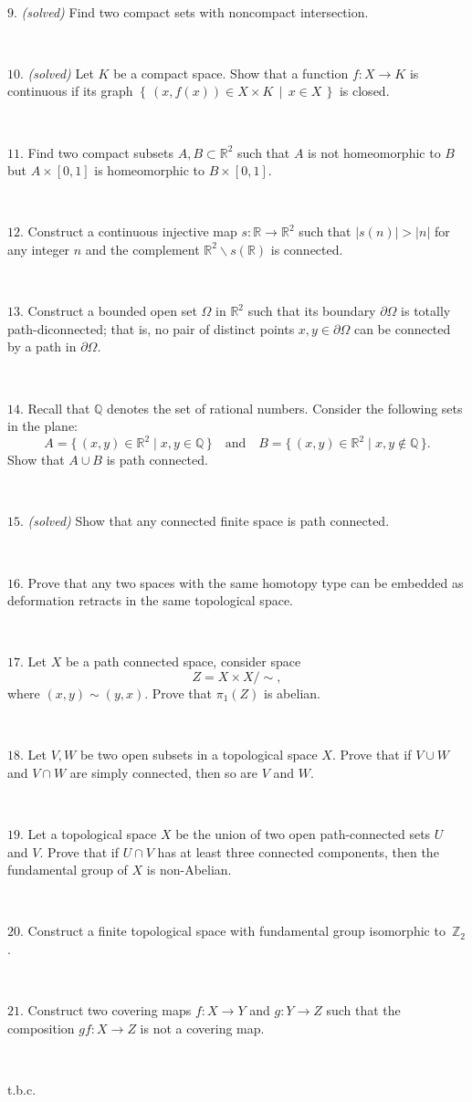 \documentclass{article}
\def\noi{\noindent}%
\def\RR{\mathbb{R}}%
\def\ZZ{\mathbb{Z}}%
\def\QQ{\mathbb{Q}}%
\def\i{\subset}
\def\:{\colon}
\newcommand{\set}[2]{\left\{\,#1\,\middle|\,#2\,\right\}}
\begin{document}
\ 

\noi \sout{$9.$} \textit{(solved)} Find two compact sets with noncompact intersection.

\ 

\noi \sout{$10.$} \textit{(solved)} Let $K$ be a compact space.
Show that a function $f\:X\to K$ is continuous if its graph $\set{(x,f(x))\in X\times K}{x\in X}$ is closed. 

\ 

\noi $11$. Find two compact subsets $A,B\i\RR^2$ such that 
$A$ is not homeomorphic to $B$ but $A\times[0,1]$ is homeomorphic to $B\times[0,1]$.

\ 

\noi $12$. Construct a continuous injective map $s\:\RR\to\RR^2$ such that $|s(n)|>|n|$ for any integer $n$ and the complement $\RR^2\backslash s(\RR)$ is connected. 

\ 

\noi $13.$
Construct a bounded open set $\Omega$ in $\RR^2$
such that its boundary $\partial \Omega$ is totally path-diconnected;
that is, no pair of distinct points $x,y\in\partial \Omega$ can be connected by a path in $\partial \Omega$.

\ 

\noi $14.$
Recall that $\QQ$ denotes the set of rational numbers.
Consider the following sets in the plane:
\[A=\{\,(x,y)\in\RR^2\mid x,y\in\QQ\,\}
\quad\text{and}\quad
B=\{\,(x,y)\in\RR^2\mid x,y\notin\QQ\,\}.\]
Show that $A\cup B$ is path connected.

\ 

\noi \sout{$15.$} \textit{(solved)} Show that any connected finite space is path connected.

\ 

\noi $16.$ Prove that any two spaces with the same homotopy type 
can be embedded as
deformation retracts in the same topological space.

\ 

\noi $17.$ Let $X$ be a path connected space, consider space 
$$Z=X\times X/\sim,$$
where $(x,y)\sim(y,x)$.
Prove that $\pi_1(Z)$ is abelian.

\ 

\noi $18.$ Let $V, W$ be two open subsets in a topological space $X$. 
Prove that if
$V \cup W$ and $V \cap W$ are simply connected, then so are $V$ and $W$.

\ 

\noi $19.$ Let a topological space $X$ be the union of two open path-connected sets $U$ and $V$. 
Prove that if $U\cap V$ has at least three connected components, then the fundamental group of $X$ is non-Abelian.

\ 

\noi $20.$ Construct a finite topological space with fundamental group isomorphic to~$\ZZ_2$.

\ 

\noi $21.$ Construct two covering maps $f\:X\to Y$ and $g\:Y\to Z$ such that the composition $gf\:X\to Z$ is not a covering map.

\ 

\noi t.b.c.
\end{document}
